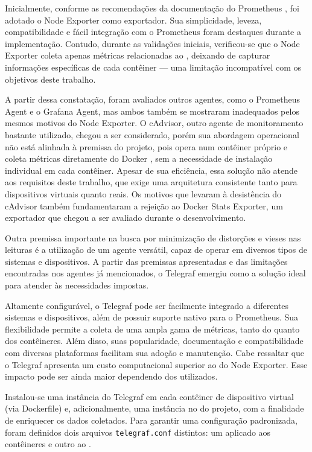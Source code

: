 Inicialmente, conforme as recomendações da documentação do Prometheus \citep{promnodeexporter2025}, foi adotado o Node Exporter como exportador. Sua simplicidade, leveza, compatibilidade e fácil integração com o Prometheus foram destaques durante a implementação. Contudo, durante as validações iniciais, verificou-se que o Node Exporter coleta apenas métricas relacionadas ao , deixando de capturar informações específicas de cada contêiner --- uma limitação incompatível com os objetivos deste trabalho.

A partir dessa constatação, foram avaliados outros agentes, como o Prometheus Agent e o Grafana Agent, mas ambos também se mostraram inadequados pelos mesmos motivos do Node Exporter. O cAdvisor, outro agente de monitoramento bastante utilizado, chegou a ser considerado, porém sua abordagem operacional não está alinhada à premissa do projeto, pois opera num contêiner próprio e coleta métricas diretamente do Docker , sem a necessidade de instalação individual em cada contêiner. Apesar de sua eficiência, essa solução não atende aos requisitos deste trabalho, que exige uma arquitetura consistente tanto para dispositivos virtuais quanto reais. Os motivos que levaram à desistência do cAdvisor também fundamentaram a rejeição ao Docker Stats Exporter, um exportador que chegou a ser avaliado durante o desenvolvimento.

Outra premissa importante na busca por minimização de distorções e vieses nas leituras é a utilização de um agente versátil, capaz de operar em diversos tipos de sistemas e dispositivos. A partir das premissas apresentadas e das limitações encontradas nos agentes já mencionados, o Telegraf emergiu como a solução ideal para atender às necessidades impostas.

Altamente configurável, o Telegraf pode ser facilmente integrado a diferentes sistemas e dispositivos, além de possuir suporte nativo para o Prometheus. Sua flexibilidade permite a coleta de uma ampla gama de métricas, tanto do  quanto dos contêineres. Além disso, suas popularidade, documentação e compatibilidade com diversas plataformas facilitam sua adoção e manutenção. Cabe ressaltar que o Telegraf apresenta um custo computacional superior ao do Node Exporter. Esse impacto pode ser ainda maior dependendo dos  utilizados.

Instalou-se uma instância do Telegraf em cada contêiner de dispositivo virtual (via Dockerfile) e, adicionalmente, uma instância no  do projeto, com a finalidade de enriquecer os dados coletados. Para garantir uma configuração padronizada, foram definidos dois arquivos \verb|telegraf.conf| distintos: um aplicado aos contêineres e outro ao .


